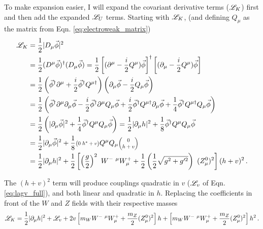     To make expansion easier, I will expand the covariant derivative terms ($\mathscr{L}_K$) first
        and then add the expanded $\mathscr{L}_U$ terms.
    Starting with $\mathscr{L}_K$, (and defining $Q_{\mu}$ as the matrix from Eqn. \ref{eq:electroweak_matrix})
    \begin{equation} \begin{split}
        \Lag_K &= \frac{1}{2} |D_{\mu} \vec{\phi}|^2
            \\&= \frac{1}{2} (D^{\mu} \vec{\phi})^\dag (D_{\mu} \vec{\phi})
                = \frac{1}{2} \left[(\partial^{\mu} - \frac{i}{2}Q^{\mu}) \vec{\phi}\right]^\dag
                \left[(\partial_{\mu} - \frac{i}{2}Q^{\mu}) \vec{\phi}\right]
            \\&= \frac{1}{2} \left(\vec{\phi}^\dag \partial^{\mu} + \frac{i}{2} \vec{\phi}^\dag Q^{\mu \dag} \right)
                \left(\partial_{\mu}\vec{\phi} - \frac{i}{2}Q_{\mu}\vec{\phi} \right)
            \\&= \frac{1}{2} \left(
                \vec{\phi}^\dag \partial^{\mu} \partial_{\mu}\vec{\phi}
                - \frac{i}{2} \vec{\phi}^\dag \partial^{\mu} Q_{\mu}\vec{\phi}
                + \frac{i}{2} \vec{\phi}^\dag Q^{\mu \dag} \partial_{\mu}\vec{\phi}
                + \frac{1}{4} \vec{\phi}^\dag Q^{\mu \dag} Q_{\mu}\vec{\phi}
                \right)
            \\&= \frac{1}{2} \left(
                | \partial_{\mu}\vec{\phi} |^2
                + \frac{1}{4} \vec{\phi}^\dag Q^{\mu} Q_{\mu} \vec{\phi}
                \right)
                = \frac{1}{2} | \partial_{\mu}h |^2 + \frac{1}{8} \vec{\phi}^\dag Q^{\mu}Q_{\mu} \vec{\phi}
            \\&= \frac{1}{2} | \partial_{\mu}\vec{\phi} |^2 + \frac{1}{8} 
                    \minimatrix{0 & h^* + v} Q^{\mu}
                    Q_{\mu} \minimatrix{0 \\ h + v}
            \\&= \frac{1}{2} | \partial_{\mu}h |^2
                + \frac{1}{2} \left[ \left(\frac{g}{2}\right)^2\  W^{-\ \mu} W^+_{\mu}
                + \frac{1}{2} \left(\frac{1}{2}\sqrt{g^2 + g^{\prime 2}}\right)\ (Z^0_{\mu})^2 \right] (h+v)^2
        \,.
    \end{split} \end{equation}

    The $(h+v)^2$ term will produce couplings quadratic in $v$ ($\mathscr{L}_v$ of Eqn. \ref{eq:lagv_full}), and both linear and quadratic in $h$.
    Replacing the coefficients in front of the $W$ and $Z$ fields with their respective masses
    \begin{equation} \begin{split}
        \mathscr{L}_K = \frac{1}{2} | \partial_{\mu}h |^2 + \mathscr{L}_v
            + 2v\left[ m_W W^{-\ \mu} W^+_{\mu} + \frac{m_Z}{2} (Z^0_{\mu})^2 \right] h
            + \left[ m_W W^{-\ \mu} W^+_{\mu} + \frac{m_Z}{2} (Z^0_{\mu})^2 \right] h^2
        \,.
    \end{split} \end{equation}

